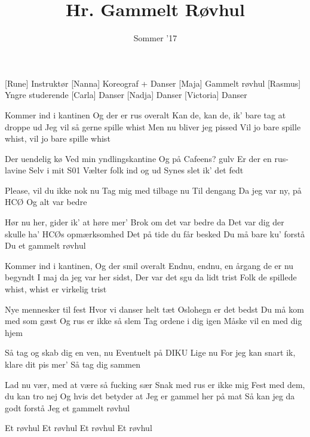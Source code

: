 \documentclass[a4paper,11pt]{article}
\title{Hr. Gammelt Røvhul}
\author{Sommer '17}
\begin{document}
\maketitle

\begin{roles}
[Rune] Instruktør
[Nanna] Koreograf + Danser
[Maja] Gammelt røvhul
[Rasmus] Yngre studerende
[Carla] Danser
[Nadja] Danser
[Victoria] Danser
\end{roles}

\begin{props}
\end{props}


\begin{song}
 Kommer ind i kantinen
Og der er rus overalt
Kan de, kan de, ik' bare tag at droppe ud
Jeg vil så gerne spille whist
Men nu bliver jeg pissed
Vil jo bare spille whist, vil jo bare spille whist

Der uendelig kø
Ved min yndlingskantine
Og på Cafeens? gulv
Er der en rus-lavine
Selv i mit S01
Vælter folk ind og ud
Synes slet ik' det fedt

Please, vil du ikke nok nu
Tag mig med tilbage nu
Til dengang
Da jeg var ny, på HCØ
Og alt var bedre

 Hør nu her, gider ik' at høre mer'
Brok om det var bedre da
Det var dig der skulle ha'
HCØs opmærksomhed
Det på tide du får besked
Du må bare ku' forstå
Du et gammelt røvhul

 Kommer ind i kantinen, 
Og der smil overalt
Endnu, endnu, en årgang de er nu begyndt
I maj da jeg var her sidst,
Der var det sgu da lidt trist
Folk de spillede whist, whist er virkelig trist

 Nye mennesker til fest
Hvor vi danser helt tæt
Oslohegn er det bedst
Du må kom med som gæst
Og rus er ikke så slem
Tag ordene i dig igen
Måske vil en med dig hjem

 Så tag og skab dig en ven, nu
Eventuelt på DIKU
Lige nu
For jeg kan snart ik, klare dit pis mer'
Så tag dig sammen

 Lad nu vær, med at være så fucking sær
Snak med rus er ikke mig
Fest med dem, du kan tro nej
Og hvis det betyder at
Jeg er gammel her på mat
Så kan jeg da godt forstå
Jeg et gammelt røvhul


 Et røvhul
Et røvhul
Et røvhul
Et røvhul
\end{song}
\end{document}
